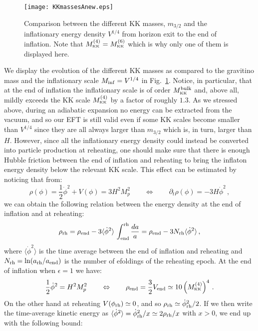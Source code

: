 \documentclass[11pt,a4paper]{article}
\newcommand{\be}{\begin{equation}}
\newcommand{\ee}{\end{equation}}
\def\KK{{\scriptscriptstyle \rm KK}}
\begin{document}
\begin{figure}[h!]
\begin{center}
\texttt{[image: KKmassesAnew.eps]}
\caption{Comparison between the different KK masses, $m_{3/2}$ and the inflationary energy density $V^{1/4}$ from horizon exit to the end of inflation. Note that $M_\KK^{(4)} = M_\KK^{(6)}$ which is why only one of them is displayed here.} 
\label{Fig:exA_KK_masses}
\end{center}
\end{figure}

We display the evolution of the different KK masses as compared to the gravitino mass and the inflationary scale $M_{\rm inf} = V^{1/4}$ in Fig.~\ref{Fig:exA_KK_masses}. Notice, in particular, that at the end of inflation the inflationary scale is of order $M_\KK^{\rm bulk}$ and, above all, mildly exceeds the KK scale $M_\KK^{(4)}$ by a factor of roughly $1.3$. As we stressed above, during an adiabatic expansion no energy can be extracted from the vacuum, and so our EFT is still valid even if some KK scales become smaller than $V^{1/4}$ since they are all always larger than $m_{3/2}$ which is, in turn, larger than $H$.
However, since all the inflationary energy density could instead be converted into particle production at reheating, one should make sure that there is enough Hubble friction between the end of inflation and reheating to bring the inflaton energy density below the relevant KK scale. This effect can be estimated by noticing that from: 
\be
\rho(\phi)=\frac12 \dot{\phi}^2 + V(\phi) = 3 H^2 M_p^2 \qquad\Leftrightarrow\qquad\partial_t \rho(\phi) = - 3 H\dot{\phi}^2\,,
\ee
we can obtain the following relation between the energy density at the end of inflation and at reheating:
\be
\rho_{\rm rh} = \rho_{\rm end} - 3 \langle \dot{\phi}^2 \rangle\, \int_{\rm end}^{\rm rh} \frac{da}{a} 
= \rho_{\rm end} - 3 N_{\rm rh} \langle \dot{\phi}^2 \rangle\,,
\ee
where $\langle \dot{\phi}^2 \rangle$ is the time average between the end of inflation and reheating and $N_{\rm rh}=\ln(a_{\rm rh}/a_{\rm end})$ is the number of efoldings of the reheating epoch. At the end of inflation when $\epsilon=1$ we have:
\be
\frac12 \dot{\phi}^2 = H^2 M_p^2 \qquad\Leftrightarrow\qquad \rho_{\rm end} = \frac32 V_{\rm end} \simeq 10 \left(M_\KK^{(4)}\right)^4\,.
\ee
On the other hand at reheating $V(\phi_{\rm rh})\simeq 0$, and so $\rho_{\rm rh}\simeq \dot{\phi}_{\rm rh}^2/2$. If we then write the time-average kinetic energy as $\langle \dot{\phi}^2 \rangle =  \dot{\phi}_{\rm rh}^2/x \simeq 2\rho_{\rm rh}/x$ with $x>0$, we end up with the following bound:
\end{document}
